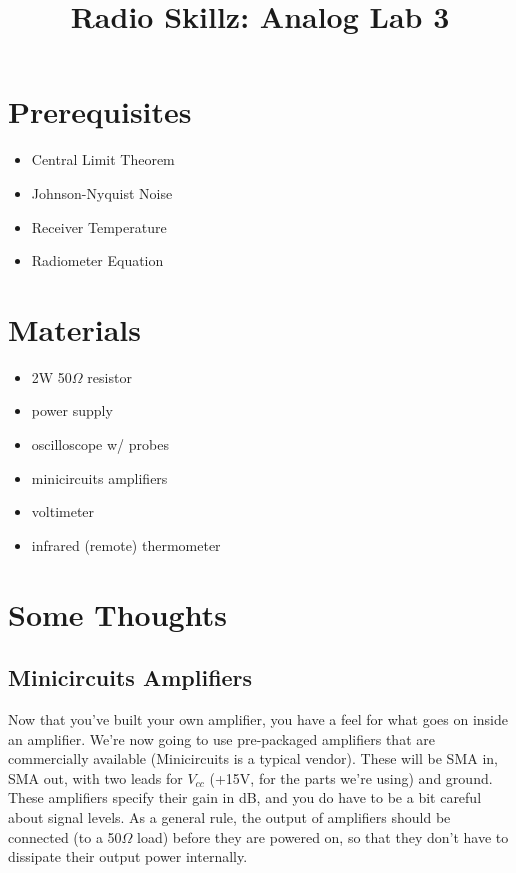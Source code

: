 \documentclass[11pt]{article}
\begin{document}
\title{Radio Skillz: Analog Lab 3}

\maketitle

\section*{Prerequisites}

\begin{itemize}
\item Central Limit Theorem
\item Johnson-Nyquist Noise
\item Receiver Temperature
\item Radiometer Equation
\end{itemize}

\section*{Materials}

\begin{itemize}
\item 2W 50$\Omega$ resistor
\item power supply
\item oscilloscope w/ probes
\item minicircuits amplifiers
\item voltimeter
\item infrared (remote) thermometer
\end{itemize}

\section*{Some Thoughts}

\subsection*{Minicircuits Amplifiers}

Now that you've built your own amplifier, you have a feel for what goes on inside an amplifier.  We're
now going to use pre-packaged amplifiers that are commercially available (Minicircuits is a typical vendor).
These will be SMA in, SMA out, with two leads for $V_{cc}$ (+15V, for the parts we're using) and ground.
These amplifiers specify their gain in dB, and you do have to be a bit careful about signal levels.
As a general rule, the output of amplifiers should be connected (to a 50$\Omega$ load) before they are
powered on, so that they don't have to dissipate their output power internally.
\end{document}

